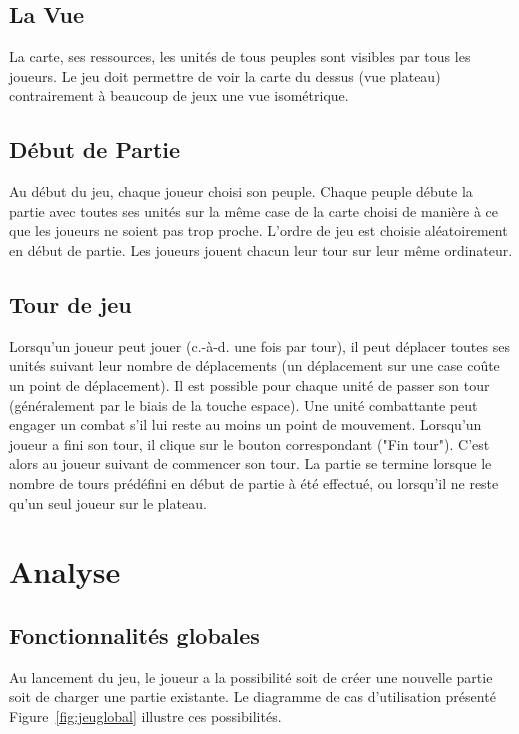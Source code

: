 \documentclass[a4paper]{article}%
\begin{document}
\subsection{La Vue}
La carte, ses ressources, les unités de tous peuples sont visibles par tous les joueurs. Le jeu doit permettre de voir la carte du dessus (vue plateau) contrairement à beaucoup de jeux  
une vue isométrique.

\subsection{Début de Partie}
Au début du jeu, chaque joueur choisi son peuple. Chaque peuple débute la partie avec toutes ses unités sur la même case de la carte choisi de manière à ce que les joueurs ne soient pas trop proche. L’ordre de jeu est choisie aléatoirement en début de partie. Les joueurs jouent chacun leur tour sur leur même ordinateur.

\subsection{Tour de jeu}
\label{tourdejeu}
Lorsqu’un joueur peut jouer (c.-à-d. une fois par tour), il peut déplacer toutes ses unités suivant leur nombre de déplacements (un déplacement sur une case coûte un point de déplacement). Il est possible pour chaque unité de passer son tour (généralement par le biais de la touche espace). Une unité combattante peut engager un combat s’il lui reste au moins un point de mouvement. Lorsqu’un joueur a fini son tour, il clique sur le bouton correspondant ("Fin tour"). C’est alors au joueur suivant de commencer son tour. La partie se termine lorsque le nombre de tours prédéfini en début de partie à été effectué, ou lorsqu’il ne reste qu’un seul joueur sur le plateau.


\section{Analyse}
\label{debut}
\subsection{Fonctionnalités globales}
Au lancement du jeu, le joueur a la possibilité soit de créer une nouvelle partie soit de charger une partie existante. Le diagramme de cas d'utilisation présenté Figure~\ref{fig:jeuglobal} illustre ces possibilités.
\end{document}

